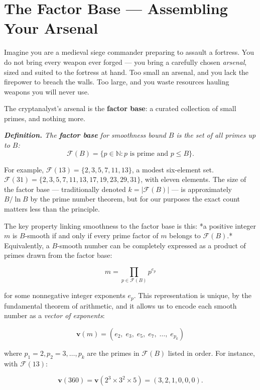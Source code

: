 \documentclass[11pt,openright,twoside]{book}
\renewenvironment{quotation}{%
  \par\vspace{8pt}%
  \begin{list}{}{%
    \setlength{\leftmargin}{2em}%
    \setlength{\rightmargin}{2em}%
  }\item[]\itshape\color{pullquote}%
}{%
  \end{list}%
  \par\vspace{8pt}%
}
\theoremstyle{definition}
\begin{document}
\section{The Factor Base — Assembling Your Arsenal}

Imagine you are a medieval siege commander preparing to assault a fortress. You do not bring every weapon ever forged --- you bring a carefully chosen \textit{arsenal}, sized and suited to the fortress at hand. Too small an arsenal, and you lack the firepower to breach the walls. Too large, and you waste resources hauling weapons you will never use.

The cryptanalyst's arsenal is the \textbf{factor base}: a curated collection of small primes, and nothing more.

\begin{quotation}
\noindent\itshape \textbf{Definition.} The \textbf{factor base} for smoothness bound $B$ is the set of all primes up to $B$: $$\mathcal{F}(B) = \{ p \in \mathbb{N} : p \text{ is prime and } p \leq B \}.$$
\end{quotation}

For example, $\mathcal{F}(13) = \{2, 3, 5, 7, 11, 13\}$, a modest six-element set. $\mathcal{F}(31) = \{2, 3, 5, 7, 11, 13, 17, 19, 23, 29, 31\}$, with eleven elements. The size of the factor base --- traditionally denoted $k = |\mathcal{F}(B)|$ --- is approximately $B / \ln B$ by the prime number theorem, but for our purposes the exact count matters less than the principle.

The key property linking smoothness to the factor base is this: *a positive integer $m$ is $B$-smooth if and only if every prime factor of $m$ belongs to $\mathcal{F}(B)$.* Equivalently, a $B$-smooth number can be completely expressed as a product of primes drawn from the factor base:

\[m = \prod_{p \in \mathcal{F}(B)} p^{e_p}\]

for some nonneg­ative integer exponents $e_p$. This representation is unique, by the fundamental theorem of arithmetic, and it allows us to encode each smooth number as a \textit{vector of exponents}:

\[\mathbf{v}(m) = (e_2, \; e_3, \; e_5, \; e_7, \; \ldots, \; e_{p_k})\]

where $p_1 = 2, p_2 = 3, \ldots, p_k$ are the primes in $\mathcal{F}(B)$ listed in order. For instance, with $\mathcal{F}(13)$:

\[\mathbf{v}(360) = \mathbf{v}(2^3 \times 3^2 \times 5) = (3, 2, 1, 0, 0, 0).\]
\end{document}
